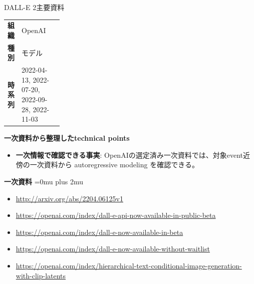 \begin{technicalnote}{DALL-E 2}{主要資料}
\begingroup
\begin{tabularx}{\linewidth}{@{}>{\bfseries}p{0.22\linewidth}X@{}}
組織 & OpenAI \\
種別 & モデル \\
時系列 & 2022-04-13, 2022-07-20, 2022-09-28, 2022-11-03 \\
\end{tabularx}
\smallskip
{\bfseries 一次資料から整理したtechnical points}
\begin{itemize}[leftmargin=1.5em,itemsep=0.35em]
\item \textbf{一次情報で確認できる事実}: OpenAIの選定済み一次資料では、対象event近傍の一次資料から autoregressive modeling を確認できる。
\end{itemize}
\begin{minipage}{\linewidth}
\begin{samepage}
{\bfseries 一次資料}
\begingroup\sloppy
\Urlmuskip=0mu plus 2mu\relax
\begin{itemize}[leftmargin=1.5em,itemsep=0.25em]
\item {\scriptsize\url{http://arxiv.org/abs/2204.06125v1}}
\item {\scriptsize\url{https://openai.com/index/dall-e-api-now-available-in-public-beta}}
\item {\scriptsize\url{https://openai.com/index/dall-e-now-available-in-beta}}
\item {\scriptsize\url{https://openai.com/index/dall-e-now-available-without-waitlist}}
\item {\scriptsize\url{https://openai.com/index/hierarchical-text-conditional-image-generation-with-clip-latents}}
\end{itemize}
\endgroup
\end{samepage}
\end{minipage}
\endgroup
\end{technicalnote}
\medskip

